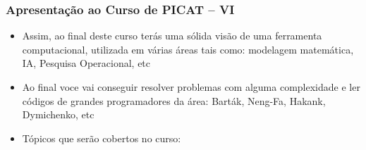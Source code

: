 \begin{frame}[fragile]
  \frametitle{Apresentação ao Curso de PICAT -- VI}
  \begin{itemize}

						
    \item Assim, ao final deste curso terás uma sólida visão  de uma ferramenta
    computacional, utilizada em várias áreas tais como: modelagem matemática, IA,
    Pesquisa Operacional, etc

    \pause
    \item Ao final voce vai conseguir resolver problemas com alguma complexidade e ler
    códigos de grandes programadores da área: Barták, Neng-Fa, Hakank, Dymichenko, etc    
    
    \pause
    \item Tópicos  que serão cobertos no curso:
  \end{itemize}

\end{frame}
